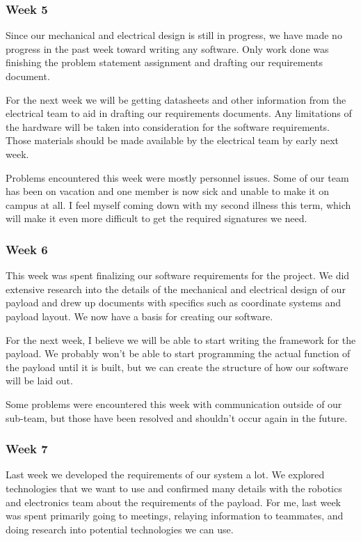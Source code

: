 \subsubsection{Week 5}
Since our mechanical and electrical design is still in progress, we have made no progress in the past week toward writing any software. Only work done was finishing the problem statement assignment and drafting our requirements document.

For the next week we will be getting datasheets and other information from the electrical team to aid in drafting our requirements documents. Any limitations of the hardware will be taken into consideration for the software requirements. Those materials should be made available by the electrical team by early next week.

Problems encountered this week were mostly personnel issues. Some of our team has been on vacation and one member is now sick and unable to make it on campus at all. I feel myself coming down with my second illness this term, which will make it even more difficult to get the required signatures we need.

\subsubsection{Week 6}
This week was spent finalizing our software requirements for the project. We did extensive research into the details of the mechanical and electrical design of our \gls{payload} and drew up documents with specifics such as coordinate systems and \gls{payload} layout. We now have a basis for creating our software.

For the next week, I believe we will be able to start writing the framework for the \gls{payload}. We probably won't be able to start programming the actual function of the \gls{payload} until it is built, but we can create the structure of how our software will be laid out.

Some problems were encountered this week with communication outside of our sub-team, but those have been resolved and shouldn't occur again in the future.

\subsubsection{Week 7}
Last week we developed the requirements of our system a lot. We explored technologies that we want to use and confirmed many details with the robotics and electronics team about the requirements of the \gls{payload}. For me, last week was spent primarily going to meetings, relaying information to teammates, and doing research into potential technologies we can use.


